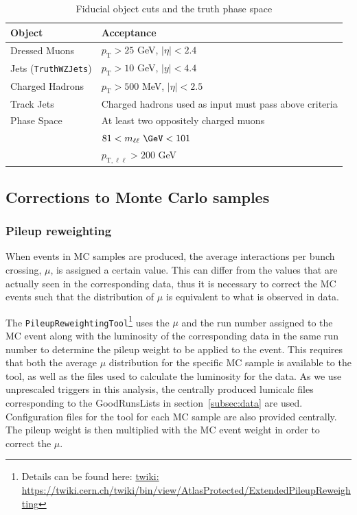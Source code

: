 \begin{table}[h!]
    \centering
    \begin{tabular}{l|l}
    \hline
    \textbf{Object} & \textbf{Acceptance} \\ \hline
    Dressed Muons & $p_\text{T} > 25$ GeV, $|\eta| < 2.4$ \\\hline
    Jets (\texttt{TruthWZJets}) & $p_\text{T} > 10$ GeV, $|y|<4.4$ \\\hline
    Charged Hadrons & $p_\text{T}>500$ MeV, $|\eta|<2.5$  \\ \hline
    Track Jets & Charged hadrons used as input must pass above criteria \\ \hline
    Phase Space & At least two oppositely charged muons \\
    & $81<m_{\ell\ell}~\GeV<101$ \\
    & $p_{\text{T},\ell\ell}>200$ GeV \\ \hline
    \end{tabular}
    \caption{Fiducial object cuts and the truth phase space}
    \label{tab:PLObjCuts}
\end{table}

\subsection{Corrections to Monte Carlo samples}
\label{subsec:MCCorr}
\subsubsection{Pileup reweighting}
When events in MC samples are produced, the average interactions per bunch crossing, $\mu$, is assigned a certain value. This can differ from the values that are actually seen in the corresponding data, thus it is
necessary to correct the MC events such that the distribution of $\mu$ is equivalent to what is observed in data.

The \texttt{PileupReweightingTool}\footnote{Details can be found here: \url{twiki: https://twiki.cern.ch/twiki/bin/view/AtlasProtected/ExtendedPileupReweighting}} uses the $\mu$ and the run number assigned to the MC event along with the luminosity of the corresponding data in the same run number to determine the pileup weight to be applied to the event.
This requires that both the average $\mu$ distribution for the specific MC sample is available to the tool, as well as the files used to calculate the luminosity for the data. As we use unprescaled triggers in this analysis, the centrally produced lumicalc files corresponding to the GoodRunsLists in section~\ref{subsec:data} are used.
Configuration files for the tool for each MC sample are also provided centrally.
The pileup weight is then multiplied with the MC event weight in order to correct the $\mu$.

